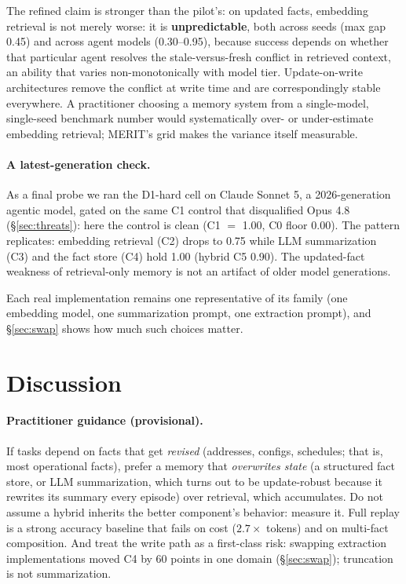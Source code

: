 \documentclass[11pt]{article}
\begin{document}
The refined claim is stronger than the pilot's: on updated facts,
embedding retrieval is not merely worse: it is \textbf{unpredictable},
both across seeds (max gap 0.45) and across agent models (0.30--0.95),
because success depends on whether that particular agent resolves the
stale-versus-fresh conflict in retrieved context, an ability that varies
non-monotonically with model tier. Update-on-write architectures remove
the conflict at write time and are correspondingly stable everywhere. A
practitioner choosing a memory system from a single-model, single-seed
benchmark number would systematically over- or under-estimate embedding
retrieval; MERIT's grid makes the variance itself measurable.

\paragraph{A latest-generation check.} As a final probe we ran the D1-hard
cell on Claude Sonnet 5, a 2026-generation agentic model, gated on the same
C1 control that disqualified Opus 4.8 (\S\ref{sec:threats}): here the control is clean (C1 $=$ 1.00, C0 floor
0.00). The pattern replicates: embedding retrieval (C2) drops to 0.75 while
LLM summarization (C3) and the fact store (C4) hold 1.00 (hybrid C5 0.90).
The updated-fact weakness of retrieval-only memory is not an artifact of
older model generations.

Each real implementation remains one representative of its family (one
embedding model, one summarization prompt, one extraction prompt), and
\S\ref{sec:swap} shows how much such choices matter.

\section{Discussion}\label{sec:discussion}

\paragraph{Practitioner guidance (provisional).}
If tasks depend on facts that get \emph{revised} (addresses, configs,
schedules; that is, most operational facts), prefer a memory that \emph{overwrites
state} (a structured fact store, or LLM summarization, which turns out to
be update-robust because it rewrites its summary every episode) over
retrieval, which accumulates. Do not assume a hybrid inherits the better
component's behavior: measure it. Full replay is a strong accuracy
baseline that fails on cost ($2.7\times$ tokens) and on multi-fact
composition. And treat the write path as a first-class risk: swapping
extraction implementations moved C4 by 60 points in one domain
(\S\ref{sec:swap}); truncation is not summarization.
\end{document}
